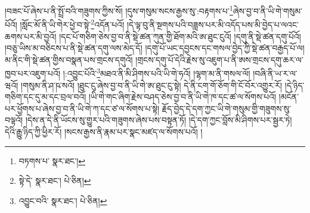 །བཟང་པོ་ཞེས་པ་ནི་སྤྲོ་བའི་གཟུགས་ཀྱིས་སོ། །དུས་གསུམ་སངས་རྒྱས་སུ་:བརྟགས་པ་\footnote{བཏགས་པ་  སྣར་ཐང་། }ཞེས་བྱ་བ་ནི་ཡི་གེ་གསུམ་པོའོ། །སློང་མོ་ནི་ཡི་གེར་ཕྱེ་བ་སྟེ་\footnote{སྟེ་དེ་  སྣར་ཐང་།  པེ་ཅིན། }འདོན་པའོ། །དེ་ལྟ་བུ་ནི་སྔགས་པའི་བཟླས་པར་མི་འདོད་པས་མི་བྱེད་པ་ལའང་ཆགས་པར་མི་བྱའོ། །དང་པོ་གཅིག་ཅེས་བྱ་བ་ནི་སྡེ་ཚན་ཀུན་གྱི་ཐོག་མའི་ཨ་ཐུང་ངུའོ། །དགུ་ནི་སྡེ་ཚན་དགུ་པོའོ། །བཅུ་ཡིས་མ་བཅིངས་པ་ནི་སྡེ་ཚན་དགུ་ལས་མེད་དོ། །དགུ་པོ་ཡང་དབྱངས་དང་གསལ་བྱེད་ཀྱི་སྡེ་ཚན་བརྒྱད་པོ་ལ། མ་ནིང་གི་སྡེ་ཚན་གྱིས་བསྣན་པས་གྲངས་དགུའོ། །གྲངས་དགུ་པོ་དེའི་རྗེས་སུ་འཇུག་པ་ནི་ཨས་གྲངས་དགུ་ཆར་ལ་ཁྱབ་པར་འཇུག་པའོ། །:འབྱུང་པོའི་\footnote{འབྱུང་བའི་  སྣར་ཐང་།  པེ་ཅིན། }མཐའ་ནི་མི་ཤིགས་པའི་ཡི་གེ་ཧའོ། །ལྷག་མ་ནི་གསལ་ལོ། །བཞི་ནི་ཡ་ར་ལ་ཝའོ། །གསུམ་ནི་ཤ་ཥ་སའོ། །ཐུང་ངུ་ཞེས་བྱ་བ་ནི་ཡི་གེ་ཨ་ཐུང་ངུ་སྟེ། དེ་ནི་ངག་གོ་ཅོག་གི་ངོ་བོར་འགྱུར་རོ། །དེ་ཉིད་གཅིག་དང་དུ་མ་དང་བྲལ་བའོ། །ཡི་གེ་གང་ཞིག་རྗེས་བཤད་ཅེས་བྱ་བ་ནི་ཡི་གེ་ཁ་དང་ཚ་ལ་སོགས་པའོ། །མངོན་པར་ཕྱོགས་པ་ཞེས་བྱ་བ་ནི་ཡི་གེ་ཀ་དང་ཙ་ལ་སོགས་པ་སྟེ། རྗོད་བྱེད་དེ་དག་ཀྱང་ཡི་གེ་གསུམ་གྱི་གཟུགས་སུ་བལྟའོ། །དེས་ན་དེ་ནི་ཡོངས་སུ་གྱུར་པའི་གཟུགས་ཞེས་པས་བསྟན་ཏོ། །དེ་དག་ཀྱང་བློས་མི་ཤིགས་པར་སྦྱར་ཏེ། དེའི་རྒྱུ་ཉིད་ཀྱི་ཕྱིར་རོ། །སངས་རྒྱས་ནི་རྣམ་པར་སྣང་མཛད་ལ་སོགས་པའོ། །
